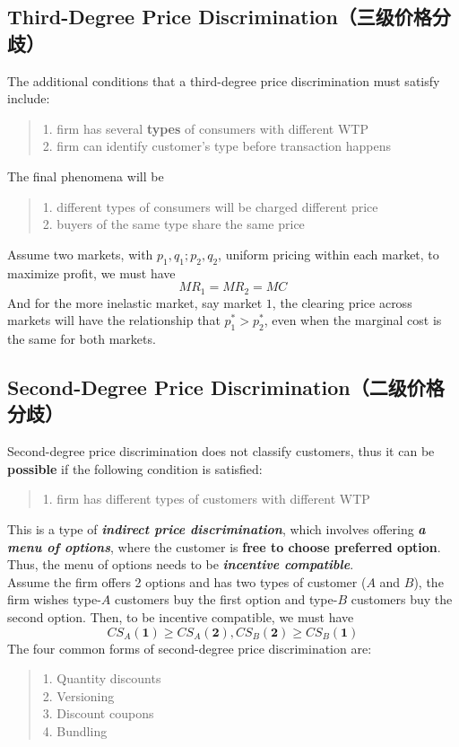 \subsection{Third-Degree Price Discrimination（三级价格分歧）}
The additional conditions that a third-degree price discrimination must satisfy include:
\begin{quote}
    1. firm has several \textbf{types} of consumers with different WTP \\
    2. firm can identify customer's type before transaction happens
\end{quote}
The final phenomena will be
\begin{quote}
    1. different types of consumers will be charged different price \\
    2. buyers of the same type share the same price 
\end{quote}
Assume two markets, with $p_1, q_1; p_2, q_2$, uniform pricing within each market, to maximize profit, we must have
$$MR_1 = MR_2 = MC$$
And for the more inelastic market, say market $1$, the clearing price across markets will have the relationship that $p_1^{*} > p_2^{*}$, even when the marginal cost is the same for both markets.

\subsection{Second-Degree Price Discrimination（二级价格分歧）}
Second-degree price discrimination does not classify customers, thus it can be \textbf{possible} if the following condition is satisfied:
\begin{quote}
    1. firm has different types of customers with different WTP
\end{quote}
This is a type of \textbf{\textit{indirect price discrimination}}, which involves offering \textbf{\textit{a menu of options}}, where the customer is \textbf{free to choose preferred option}. Thus, the menu of options needs to be \textbf{\textit{incentive compatible}}. \\
Assume the firm offers 2 options and has two types of customer ($A$ and $B$), the firm wishes type-$A$ customers buy the first option and type-$B$ customers buy the second option. Then, to be incentive compatible, we must have
$$CS_A(\textbf{1}) \ge CS_A(\textbf{2}), CS_B(\textbf{2}) \ge CS_B(\textbf{1})$$
The four common forms of second-degree price discrimination are:
\begin{quote}
    1. Quantity discounts \\
    2. Versioning \\
    3. Discount coupons \\
    4. Bundling
\end{quote}
